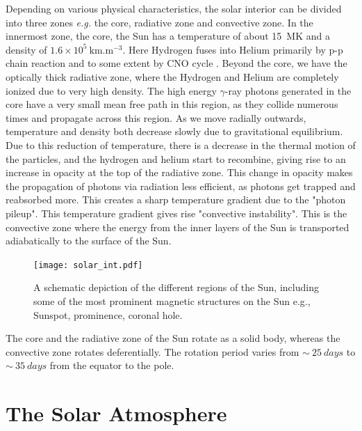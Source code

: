 Depending on various physical characteristics, the solar interior can be divided into three zones {\it e.g.} the core, radiative zone and convective zone. In the innermost zone, the core, the Sun has a temperature of about 15~MK and a density of $\mathrm{1.6\times 10^{5}~km.m^{-3}}$. Here Hydrogen fuses into Helium primarily by p-p chain reaction \citep{bethe38} and to some extent by CNO cycle \citep{bethe39}. Beyond the core, we have the optically thick radiative zone, where the Hydrogen and Helium are completely ionized due to very high density. The high energy $\gamma$-ray photons generated in the core have a very small mean free path in this region, as they collide numerous times and propagate across this region. As we move radially outwards, temperature and density both decrease slowly due to gravitational equilibrium. Due to this reduction of temperature, there is a decrease in the thermal motion of the particles, and the hydrogen and helium start to recombine, giving rise to an increase in opacity at the top of the radiative zone. This change in opacity makes the propagation of photons via radiation less efficient, as photons get trapped and reabsorbed more. This creates a sharp temperature gradient due to the "photon pileup". This temperature gradient gives rise "convective instability". This is the convective zone where the energy from the inner layers of the Sun is transported adiabatically to the surface of the Sun.

\begin{figure}[ht!]
    \centering
    \texttt{[image: solar\_int.pdf]}
    \caption[A schematic depiction of the different regions of the Sun.]{A schematic depiction of the different regions of the Sun, including some of the most prominent magnetic structures on the Sun e.g., Sunspot, prominence, coronal hole.}
    \label{fig_solar_int}
\end{figure}

The core and the radiative zone of the Sun rotate as a solid body, whereas the convective zone rotates deferentially. The rotation period varies from $\sim~25~days$ to $\sim~35~days$ from the equator to the pole.

\section{The Solar Atmosphere}\label{solar_atmos}

